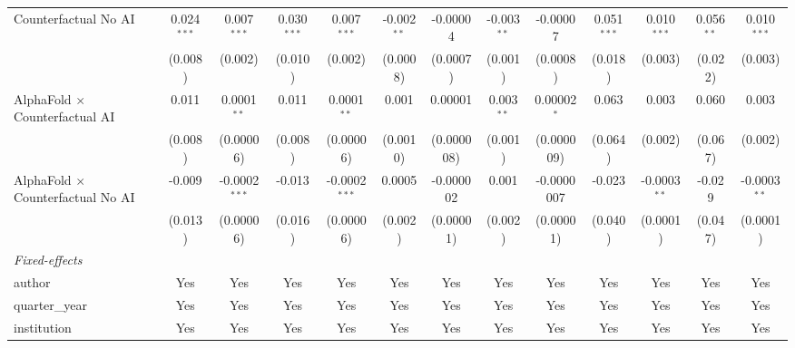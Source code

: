 \begin{tabular}{lcccccccccccc}
   Counterfactual No AI                     & 0.024$^{***}$ & 0.007$^{***}$   & 0.030$^{***}$ & 0.007$^{***}$   & -0.002$^{**}$ & -0.00004      & -0.003$^{**}$  & -0.00007      & 0.051$^{***}$ & 0.010$^{***}$  & 0.056$^{**}$  & 0.010$^{***}$\\   
                                            & (0.008)       & (0.002)         & (0.010)       & (0.002)         & (0.0008)      & (0.0007)      & (0.001)        & (0.0008)      & (0.018)       & (0.003)        & (0.022)       & (0.003)\\   
   AlphaFold $\times$ Counterfactual AI     & 0.011         & 0.0001$^{**}$   & 0.011         & 0.0001$^{**}$   & 0.001         & 0.00001       & 0.003$^{**}$   & 0.00002$^{*}$ & 0.063         & 0.003          & 0.060         & 0.003\\   
                                            & (0.008)       & (0.00006)       & (0.008)       & (0.00006)       & (0.0010)      & (0.000008)    & (0.001)        & (0.000009)    & (0.064)       & (0.002)        & (0.067)       & (0.002)\\   
   AlphaFold $\times$ Counterfactual No AI  & -0.009        & -0.0002$^{***}$ & -0.013        & -0.0002$^{***}$ & 0.0005        & -0.000002     & 0.001          & -0.0000007    & -0.023        & -0.0003$^{**}$ & -0.029        & -0.0003$^{**}$\\   
                                            & (0.013)       & (0.00006)       & (0.016)       & (0.00006)       & (0.002)       & (0.00001)     & (0.002)        & (0.00001)     & (0.040)       & (0.0001)       & (0.047)       & (0.0001)\\   
   \midrule
   \emph{Fixed-effects}\\
   author                                   & Yes           & Yes             & Yes           & Yes             & Yes           & Yes           & Yes            & Yes           & Yes           & Yes            & Yes           & Yes\\  
   quarter\_year                            & Yes           & Yes             & Yes           & Yes             & Yes           & Yes           & Yes            & Yes           & Yes           & Yes            & Yes           & Yes\\  
   institution                              & Yes           & Yes             & Yes           & Yes             & Yes           & Yes           & Yes            & Yes           & Yes           & Yes            & Yes           & Yes\\  

\end{tabular}
